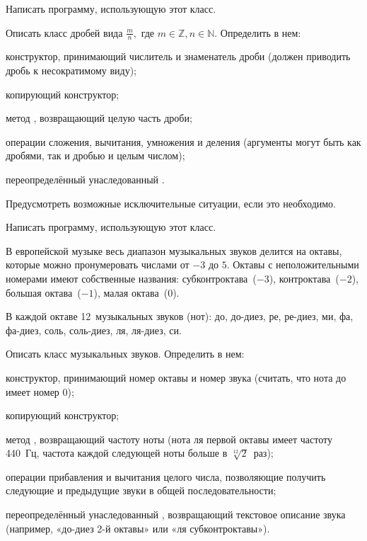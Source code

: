 Написать программу, использующую этот класс.

\task Описать класс  дробей вида $\frac{m}{n},$ где
$m \in \mathbb{Z}, n \in \mathbb{N}$.  Определить в нем:
\begin{itemize*}
\item конструктор, принимающий числитель и знаменатель дроби (должен
  приводить дробь к несократимому виду);
\item копирующий конструктор;
\item метод , возвращающий целую часть дроби;
\item операции сложения, вычитания, умножения и деления (аргументы
  могут быть как дробями, так и дробью и целым числом);
\item переопределённый унаследованный .
\end{itemize*}

Предусмотреть возможные исключительные ситуации, если это необходимо.

Написать программу, использующую этот класс.

\task В европейской музыке весь диапазон музыкальных
звуков делится на октавы, которые можно
пронумеровать числами от $-3$ до $5$. Октавы с неположительными
номерами имеют собственные названия: субконтроктава~($-3$),
контроктава~($-2$), большая октава~($-1$), малая октава~($0$).

В каждой октаве 12~музыкальных звуков (нот): до, до-диез, ре, ре-диез,
ми, фа, фа-диез, соль, соль-диез, ля, ля-диез, си.

Описать класс  музыкальных звуков. Определить в нем:
\begin{itemize*}
\item конструктор, принимающий номер октавы и номер звука (считать,
  что нота до имеет номер $0$);
\item копирующий конструктор;
\item метод , возвращающий частоту ноты (нота ля первой
  октавы имеет частоту 440~Гц, частота каждой следующей ноты больше в
  $\sqrt[12]{2}$~раз);
\item операции прибавления и вычитания целого числа, позволяющие
  получить следующие и предыдущие звуки в общей последовательности;
\item переопределённый унаследованный , возвращающий текстовое
  описание звука (например, «до-диез 2-й октавы» или «ля
  субконтроктавы»).
\end{itemize*}


